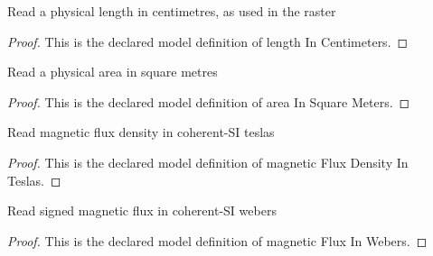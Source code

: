 \begin{definition}
  \label{def:physics:phyx-mini-0929:phyxminiproblems-problemphyxmini0929-lengthincentimeters}
  Read a physical length in centimetres, as used in the raster
\end{definition}
\begin{proof}
  This is the declared model definition of length In Centimeters.
\end{proof}
\begin{definition}
  \label{def:physics:phyx-mini-0929:phyxminiproblems-problemphyxmini0929-areainsquaremeters}
  Read a physical area in square metres
\end{definition}
\begin{proof}
  This is the declared model definition of area In Square Meters.
\end{proof}
\begin{definition}
  \label{def:physics:phyx-mini-0929:phyxminiproblems-problemphyxmini0929-magneticfluxdensityinteslas}
  Read magnetic flux density in coherent-SI teslas
\end{definition}
\begin{proof}
  This is the declared model definition of magnetic Flux Density In Teslas.
\end{proof}
\begin{definition}
  \label{def:physics:phyx-mini-0929:phyxminiproblems-problemphyxmini0929-magneticfluxinwebers}
  Read signed magnetic flux in coherent-SI webers
\end{definition}
\begin{proof}
  This is the declared model definition of magnetic Flux In Webers.
\end{proof}
